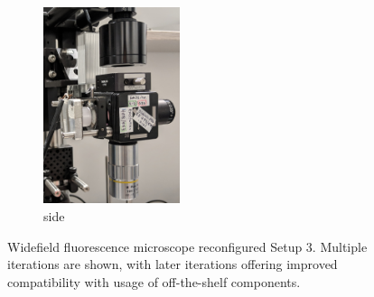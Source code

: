 \begin{figure}[htb]
	\begin{subfigure}[t]{0.32\textwidth}\centering
		\includegraphics[width=4cm]{figures/setup4-closeup.jpg}
        \caption{side}
	\end{subfigure}
	\caption[Widefield fluorescence microscope reconfigured (Setup 3)]{
		Widefield fluorescence microscope reconfigured Setup 3.
		Multiple iterations are shown, with later iterations offering improved compatibility with usage of off-the-shelf components.}
	\label{fig:microscope-3}
\end{figure}


% 

\clearpage{}

